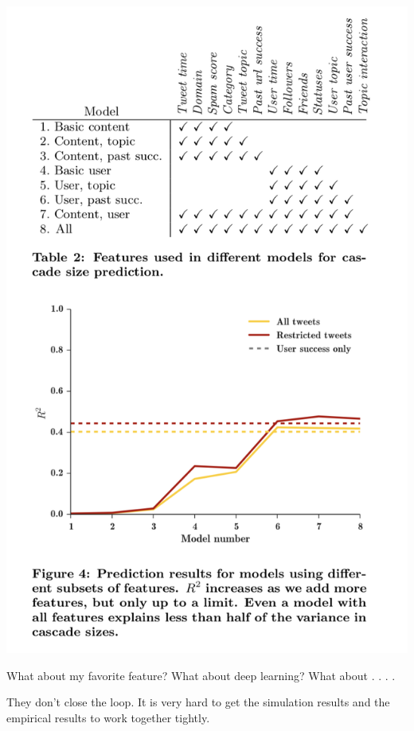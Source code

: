 \documentclass[aspectratio=169]{beamer}
\begin{document}
\begin{frame}

\begin{center}
\includegraphics[height=0.8\textheight]{figures/martin_exploring_2016_tab2_fig4}
\end{center}

\pause
\vfill
What about my favorite feature? What about deep learning? What about . . . .

\end{frame}
\begin{frame}

They don't close the loop. It is very hard to get the simulation results and the empirical results to work together tightly.

\end{frame}
\end{document}
